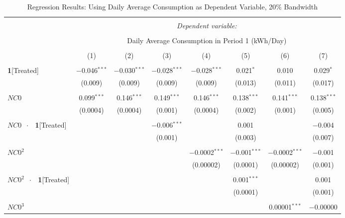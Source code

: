 \begin{table}[!htbp]
\centering 
\caption{Regression Results: Using Daily Average Consumption as Dependent Variable, 20\% Bandwidth}
\label{Table:Regression-Results_Daily-Average_20P-BW} 
\small
\begin{adjustbox}{scale = 0.65}
\begin{tabular}{@{\extracolsep{50pt}}lccccccc} 
\\[-1.8ex]\hline 
\hline \\[-1.8ex] 
 & \multicolumn{7}{c}{\textit{Dependent variable:}} \\ 
\cline{2-8} 
\\[-1.8ex] & \multicolumn{7}{c}{Daily Average Consumption in Period 1 (kWh/Day)} \\ 
\\[-1.8ex] & (1) & (2) & (3) & (4) & (5) & (6) & (7)\\ 
\hline \\[-1.8ex] 
 \textbf{1}[Treated] & $-$0.046$^{***}$ & $-$0.030$^{***}$ & $-$0.028$^{***}$ & $-$0.028$^{***}$ & 0.021$^{*}$ & 0.010 & 0.029$^{*}$ \\ 
  & (0.009) & (0.009) & (0.009) & (0.009) & (0.013) & (0.011) & (0.017) \\ 
  & & & & & & & \\ 
 $NC0$ & 0.099$^{***}$ & 0.146$^{***}$ & 0.149$^{***}$ & 0.146$^{***}$ & 0.138$^{***}$ & 0.141$^{***}$ & 0.138$^{***}$ \\ 
  & (0.0004) & (0.0004) & (0.001) & (0.0004) & (0.002) & (0.001) & (0.005) \\ 
  & & & & & & & \\ 
 $NC0$ $\ \cdot \ \ $ \textbf{1}[Treated] &  &  & $-$0.006$^{***}$ &  & 0.001 &  & $-$0.004 \\ 
  &  &  & (0.001) &  & (0.003) &  & (0.007) \\ 
  & & & & & & & \\ 
 $NC0^{2}$ &  &  &  & $-$0.0002$^{***}$ & $-$0.001$^{***}$ & $-$0.0002$^{***}$ & $-$0.001 \\ 
  &  &  &  & (0.00002) & (0.0001) & (0.00002) & (0.001) \\ 
  & & & & & & & \\ 
 $NC0^{2}$ $\ \cdot \ \ $ \textbf{1}[Treated] &  &  &  &  & 0.001$^{***}$ &  & 0.001 \\ 
  &  &  &  &  & (0.0001) &  & (0.001) \\ 
  & & & & & & & \\ 
 $NC0^{3}$ &  &  &  &  &  & 0.00001$^{***}$ & $-$0.00000 \\ 

\end{tabular}
\end{adjustbox}
\end{table}
